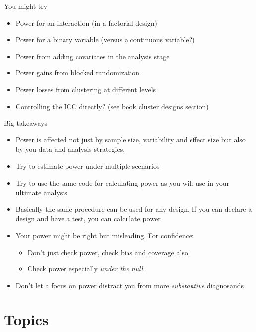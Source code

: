 \documentclass[
  11pt,
  ignorenonframetext,
]{beamer}
\providecommand{\tightlist}{%
  \setlength{\itemsep}{0pt}\setlength{\parskip}{0pt}}\usepackage{longtable,booktabs,array}
\begin{document}
\begin{frame}{You might try}
\protect\hypertarget{you-might-try}{}
\begin{itemize}
\tightlist
\item
  Power for an interaction (in a factorial design)
\item
  Power for a binary variable (versus a continuous variable?)
\item
  Power from adding covariates in the analysis stage
\item
  Power gains from blocked randomization
\item
  Power losses from clustering at different levels
\item
  Controlling the ICC directly? (see book cluster designs section)
\end{itemize}
\end{frame}

\begin{frame}{Big takeaways}
\protect\hypertarget{big-takeaways}{}
\begin{itemize}
\tightlist
\item
  Power is affected not just by sample size, variability and effect size
  but also by you data and analysis strategies.
\item
  Try to estimate power under multiple scenarios
\item
  Try to use the same code for calculating power as you will use in your
  ultimate analysis
\item
  Basically the same procedure can be used for any design. If you can
  declare a design and have a test, you can calculate power
\item
  Your power might be right but misleading. For confidence:

  \begin{itemize}
  \tightlist
  \item
    Don't just check power, check bias and coverage also
  \item
    Check power especially \emph{under the null}
  \end{itemize}
\item
  Don't let a focus on power distract you from more \emph{substantive}
  diagnosands
\end{itemize}
\end{frame}

\hypertarget{topics}{%
\section{Topics}\label{topics}}
\end{document}
